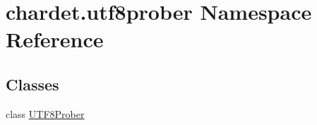 \hypertarget{namespacechardet_1_1utf8prober}{}\section{chardet.\+utf8prober Namespace Reference}
\label{namespacechardet_1_1utf8prober}
\subsection*{Classes}
\begin{DoxyCompactItemize}
\item 
class \hyperlink{classchardet_1_1utf8prober_1_1_u_t_f8_prober}{U\+T\+F8\+Prober}
\end{DoxyCompactItemize}
